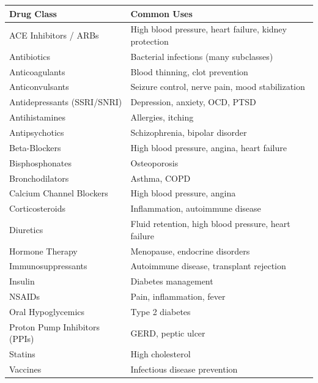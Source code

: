 \begin{tabularx}{\textwidth}{lX}
\toprule
\textbf{Drug Class} & \textbf{Common Uses} \\
\midrule
ACE Inhibitors / ARBs       & High blood pressure, heart failure, kidney protection \\
Antibiotics                 & Bacterial infections (many subclasses) \\
Anticoagulants              & Blood thinning, clot prevention \\
Anticonvulsants             & Seizure control, nerve pain, mood stabilization \\
Antidepressants (SSRI/SNRI) & Depression, anxiety, OCD, PTSD \\
Antihistamines              & Allergies, itching \\
Antipsychotics              & Schizophrenia, bipolar disorder \\
Beta-Blockers               & High blood pressure, angina, heart failure \\
Bisphosphonates             & Osteoporosis \\
Bronchodilators             & Asthma, COPD \\
Calcium Channel Blockers    & High blood pressure, angina \\
Corticosteroids             & Inflammation, autoimmune disease \\
Diuretics                   & Fluid retention, high blood pressure, heart failure \\
Hormone Therapy             & Menopause, endocrine disorders \\
Immunosuppressants          & Autoimmune disease, transplant rejection \\
Insulin                     & Diabetes management \\
NSAIDs                      & Pain, inflammation, fever \\
Oral Hypoglycemics          & Type 2 diabetes \\
Proton Pump Inhibitors (PPIs) & GERD, peptic ulcer \\
Statins                     & High cholesterol \\
Vaccines                    & Infectious disease prevention \\
\bottomrule
\end{tabularx}
